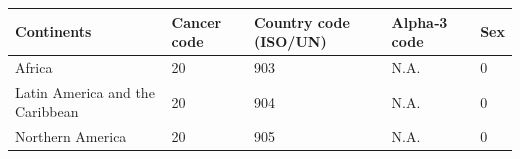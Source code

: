 \begin{tabular}{p{3cm}p{1.2cm}p{1.5cm}p{1.2cm}p{1cm}}
\toprule
Continents & Cancer code & Country code (ISO/UN) & Alpha‑3 code & Sex \\
\midrule
Africa & 20 & 903 & N.A. & 0 \\
Latin America and the Caribbean & 20 & 904 & N.A. & 0 \\
Northern America & 20 & 905 & N.A. & 0 \\
\bottomrule
\end{tabular} 